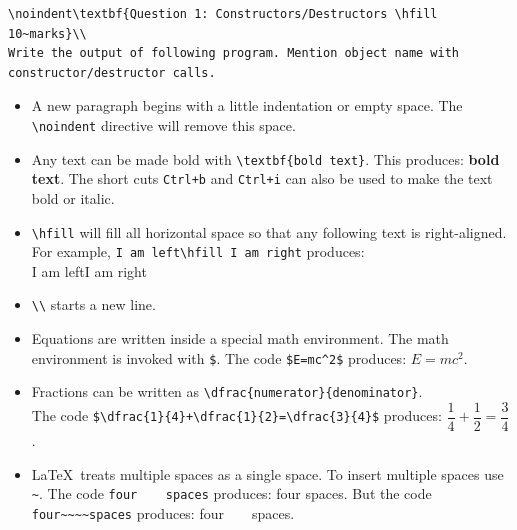 \documentclass[12pt,a4paper]{article}
\begin{document}
\begin{lstlisting}
\noindent\textbf{Question 1: Constructors/Destructors \hfill 10~marks}\\
Write the output of following program. Mention object name with constructor/destructor calls.
\end{lstlisting}
\begin{itemize}
\itemsep0em
\item A new paragraph begins with a little indentation or empty space. The \verb|\noindent| directive will remove this space.
\item Any text can be made bold with \verb|\textbf{bold text}|. This produces: \textbf{bold text}. The short cuts \verb|Ctrl+b| and \verb|Ctrl+i| can also be used to make the text bold or italic.
\item \verb|\hfill| will fill all horizontal space so that any following text is right-aligned. For example, \verb|I am left\hfill I am right| produces:\\I am left\hfill I am right
\item \verb|\\| starts a new line.
\item Equations are written inside a special math environment. The math environment is invoked with \verb|$|. The code \verb|$E=mc^2$| produces: $E=mc^2$.
\item Fractions can be written as \verb|\dfrac{numerator}{denominator}|.\\The code \verb|$\dfrac{1}{4}+\dfrac{1}{2}=\dfrac{3}{4}$| produces: $\dfrac{1}{4}+\dfrac{1}{2}=\dfrac{3}{4}$.
\item \LaTeX~treats multiple spaces as a single space. To insert multiple spaces use \verb|~|. The code \verb|four    spaces| produces: four    spaces. But the code \verb|four~~~~spaces| produces: four~~~~spaces.
\end{itemize}
\end{document}
